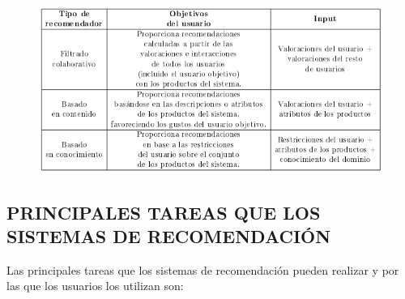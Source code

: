 \documentclass[11pt,a4paper]{article}
\begin{document}
			\begin{figure}[H]
				\begin{center}
					\includegraphics[scale=0.80]{./Imagenes/img03}		
				\end{center}
			\end{figure}
		
		\subsection{PRINCIPALES TAREAS QUE LOS SISTEMAS DE RECOMENDACIÓN}
		
		Las principales tareas que los sistemas de recomendación pueden realizar y por las que los usuarios los utilizan son: 
		
\end{document}
